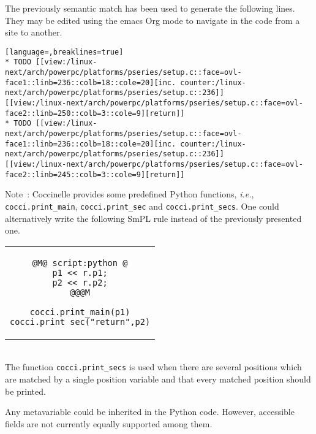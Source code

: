 The previously semantic match has been used to generate the following
lines. They may be edited using the emacs Org mode to navigate in the code
from a site to another.

\begin{lstlisting}[language=,breaklines=true]
* TODO [[view:/linux-next/arch/powerpc/platforms/pseries/setup.c::face=ovl-face1::linb=236::colb=18::cole=20][inc. counter:/linux-next/arch/powerpc/platforms/pseries/setup.c::236]]
[[view:/linux-next/arch/powerpc/platforms/pseries/setup.c::face=ovl-face2::linb=250::colb=3::cole=9][return]]
* TODO [[view:/linux-next/arch/powerpc/platforms/pseries/setup.c::face=ovl-face1::linb=236::colb=18::cole=20][inc. counter:/linux-next/arch/powerpc/platforms/pseries/setup.c::236]]
[[view:/linux-next/arch/powerpc/platforms/pseries/setup.c::face=ovl-face2::linb=245::colb=3::cole=9][return]]
\end{lstlisting}

Note~: Coccinelle provides some predefined Python functions,
\emph{i.e.}, \texttt{cocci.print\_main}, \texttt{cocci.print\_sec} and
\texttt{cocci.print\_secs}. One could alternatively write the following
SmPL rule instead of the previously presented one.

\begin{tabular}{c}
\begin{lstlisting}[language=Cocci]
@M@ script:python @
p1 << r.p1;
p2 << r.p2;
@@@M

cocci.print_main(p1)
cocci.print_sec("return",p2)
\end{lstlisting}
\end{tabular}\\

The function \texttt{cocci.print\_secs} is used when there are several
positions which are matched by a single position variable and that
every matched position should be printed.

Any metavariable could be inherited in the Python code. However,
accessible fields are not currently equally supported among them.


